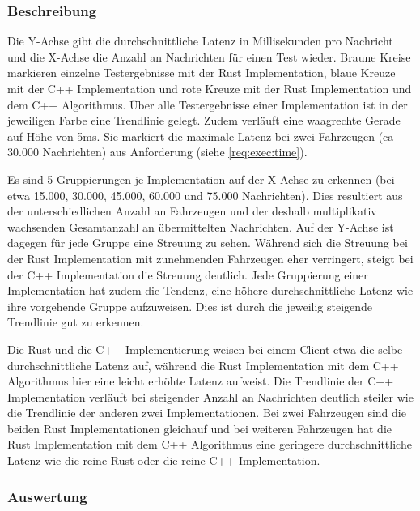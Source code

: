 
\subsubsection{Beschreibung}

Die Y-Achse gibt die durchschnittliche Latenz in Millisekunden pro Nachricht und die X-Achse die Anzahl an Nachrichten für einen Test wieder.
Braune Kreise markieren einzelne Testergebnisse mit der Rust Implementation, blaue Kreuze mit der C++ Implementation und rote Kreuze mit der Rust Implementation und dem C++ Algorithmus.
Über alle Testergebnisse einer Implementation ist in der jeweiligen Farbe eine Trendlinie gelegt.
Zudem verläuft eine waagrechte Gerade auf Höhe von 5ms. Sie markiert die maximale Latenz bei zwei Fahrzeugen (ca 30.000 Nachrichten) aus Anforderung  (siehe \autoref{req:exec:time}).

Es sind 5 Gruppierungen je Implementation auf der X-Achse zu erkennen (bei etwa 15.000, 30.000, 45.000, 60.000 und 75.000 Nachrichten).
Dies resultiert aus der unterschiedlichen Anzahl an Fahrzeugen und der deshalb multiplikativ wachsenden Gesamtanzahl an übermittelten Nachrichten.
Auf der Y-Achse ist dagegen für jede Gruppe eine Streuung zu sehen.
Während sich die Streuung bei der Rust Implementation mit zunehmenden Fahrzeugen eher verringert, steigt bei der C++ Implementation die Streuung deutlich.
Jede Gruppierung einer Implementation hat zudem die Tendenz, eine höhere durchschnittliche Latenz wie ihre vorgehende Gruppe aufzuweisen.
Dies ist durch die jeweilig steigende Trendlinie gut zu erkennen.

Die Rust und die C++ Implementierung weisen bei einem Client etwa die selbe durchschnittliche Latenz auf, während die Rust Implementation mit dem C++ Algorithmus hier eine leicht erhöhte Latenz aufweist.
Die Trendlinie der C++ Implementation verläuft bei steigender Anzahl an Nachrichten deutlich steiler wie die Trendlinie der anderen zwei Implementationen.
Bei zwei Fahrzeugen sind die beiden Rust Implementationen gleichauf und bei weiteren Fahrzeugen hat die Rust Implementation mit dem C++ Algorithmus eine geringere durchschnittliche Latenz wie die reine Rust oder die reine C++ Implementation.

\subsubsection{Auswertung}

